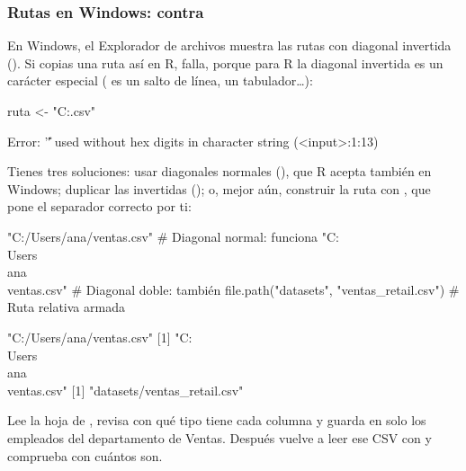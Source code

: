 \subsubsection{Rutas en Windows: \texorpdfstring{\codigo{\textbackslash}}{\textbackslash} contra \texorpdfstring{\codigo{/}}{/}}

En Windows, el Explorador de archivos muestra las rutas con diagonal
invertida (). Si
copias una ruta así en R, falla, porque para R la diagonal invertida es un
carácter especial ( es un salto de línea,
 un tabulador\ldots):

\begin{rnoejecutar}
ruta <- "C:\Users\ana\ventas.csv"
\end{rnoejecutar}
\begin{rsalida}
Error: '\U' used without hex digits in character string (<input>:1:13)
\end{rsalida}

Tienes tres soluciones: usar diagonales normales (\codigo{/}), que R
acepta también en Windows; duplicar las invertidas
(\codigo{\textbackslash\textbackslash}); o, mejor aún, construir la ruta con
, que pone el separador correcto por ti:

\begin{rcode}
"C:/Users/ana/ventas.csv"              # Diagonal normal: funciona
"C:\\Users\\ana\\ventas.csv"           # Diagonal doble: también
file.path("datasets", "ventas_retail.csv")   # Ruta relativa armada
\end{rcode}
\begin{rsalida}
[1] "C:/Users/ana/ventas.csv"
[1] "C:\\Users\\ana\\ventas.csv"
[1] "datasets/ventas_retail.csv"
\end{rsalida}

\begin{hazlotu}
Lee la hoja  de ,
revisa con  qué tipo tiene cada columna y guarda en
 solo los empleados del
departamento de Ventas. Después vuelve a leer ese CSV con
 y comprueba con  cuántos son.
\end{hazlotu}

